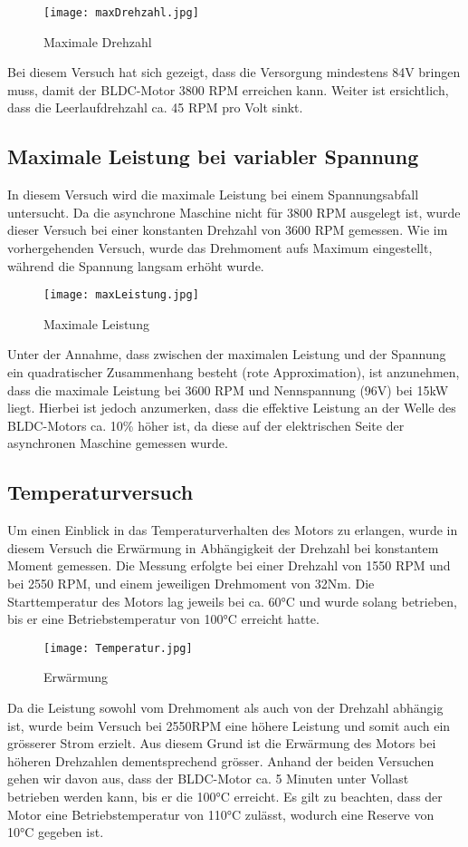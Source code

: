\begin{figure}[H]
	\centering
	\texttt{[image: maxDrehzahl.jpg]}
	\caption{Maximale Drehzahl}\label{fig:maxDrehzahl}
\end{figure}

Bei diesem Versuch hat sich gezeigt, dass die Versorgung mindestens 84V bringen muss, damit der BLDC-Motor 3800 RPM erreichen kann. Weiter ist ersichtlich, dass die Leerlaufdrehzahl ca. 45 RPM pro Volt sinkt.


\subsection{Maximale Leistung bei variabler Spannung}\label{subsec:LeistungSpannungsabfall}
In diesem Versuch wird die maximale Leistung bei einem Spannungsabfall untersucht. Da die asynchrone Maschine nicht für 3800 RPM ausgelegt ist, wurde dieser Versuch bei einer konstanten Drehzahl von 3600 RPM gemessen. Wie im vorhergehenden Versuch, wurde das Drehmoment aufs Maximum eingestellt, während die Spannung langsam erhöht wurde.


\begin{figure}[H]
	\centering
	\texttt{[image: maxLeistung.jpg]}
	\caption{Maximale Leistung}\label{fig:maxLeistung}
\end{figure}

Unter der Annahme, dass zwischen der maximalen Leistung und der Spannung ein quadratischer Zusammenhang besteht (rote Approximation), ist anzunehmen, dass die maximale Leistung bei 3600 RPM und Nennspannung (96V) bei 15kW liegt. Hierbei ist jedoch anzumerken, dass die effektive Leistung an der Welle des BLDC-Motors ca. 10\% höher ist, da diese auf der elektrischen Seite der asynchronen Maschine gemessen wurde.

\subsection{Temperaturversuch}
Um einen Einblick in das Temperaturverhalten des Motors zu erlangen, wurde in diesem Versuch die Erwärmung in Abhängigkeit der Drehzahl bei konstantem Moment gemessen. Die Messung erfolgte bei einer Drehzahl von 1550 RPM und bei 2550 RPM, und einem jeweiligen Drehmoment von 32Nm. Die Starttemperatur des Motors lag jeweils bei ca. 60°C und wurde solang betrieben, bis er eine Betriebstemperatur von 100°C erreicht hatte.


\begin{figure}[H]
	\centering
	\texttt{[image: Temperatur.jpg]}
	\caption{Erwärmung}\label{fig:Temperatur}
\end{figure}


Da die Leistung sowohl vom Drehmoment als auch von der Drehzahl abhängig ist, wurde beim Versuch bei 2550RPM eine höhere Leistung und somit auch ein grösserer Strom erzielt. Aus diesem Grund ist die Erwärmung des Motors bei höheren Drehzahlen dementsprechend grösser. Anhand der beiden Versuchen gehen wir davon aus, dass der BLDC-Motor ca. 5 Minuten unter Vollast betrieben werden kann, bis er die 100°C erreicht. Es gilt zu beachten, dass der Motor eine Betriebstemperatur von 110°C zulässt, wodurch eine Reserve von 10°C gegeben ist.
 